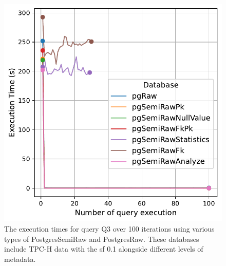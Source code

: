\begin{figure}[hbt!]
\centering
\includegraphics[width=1.0\linewidth]{charts-eval-exp-time/execution_time_db_type_Q3.pdf}
\caption[Q3:result]{The execution times for query Q3 over 100 iterations using various types of PostgresSemiRaw and PostgresRaw. These databases include TPC-H data with the \acrshort{sf} 0.1 alongside different levels of metadata.}
\label{fig:execution_time_db_type_Q3}
\end{figure}
